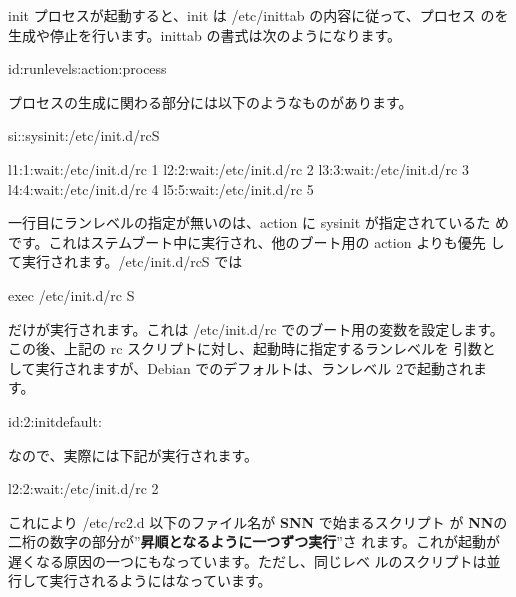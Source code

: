 \documentclass[mingoth,a4paper]{jsarticle}
\begin{document}
init プロセスが起動すると、init は /etc/inittab の内容に従って、プロセス
のを生成や停止を行います。inittab の書式は次のようになります。

\begin{commandline}
id:runlevels:action:process
\end{commandline}

プロセスの生成に関わる部分には以下のようなものがあります。

\begin{commandline}
si::sysinit:/etc/init.d/rcS

l1:1:wait:/etc/init.d/rc 1
l2:2:wait:/etc/init.d/rc 2
l3:3:wait:/etc/init.d/rc 3
l4:4:wait:/etc/init.d/rc 4
l5:5:wait:/etc/init.d/rc 5
\end{commandline}

一行目にランレベルの指定が無いのは、action に sysinit が指定されているた
めです。これはステムブート中に実行され、他のブート用の action よりも優先
して実行されます。/etc/init.d/rcS では

\begin{commandline}
exec /etc/init.d/rc S
\end{commandline}

だけが実行されます。これは /etc/init.d/rc でのブート用の変数を設定します。
この後、上記の rc スクリプトに対し、起動時に指定するランレベルを 引数と
して実行されますが、Debian でのデフォルトは、ランレベル 2で起動されます。

\begin{commandline}
id:2:initdefault:
\end{commandline}

なので、実際には下記が実行されます。

\begin{commandline}
l2:2:wait:/etc/init.d/rc 2
\end{commandline}

これにより /etc/rc2.d 以下のファイル名が \textbf{SNN} で始まるスクリプト
が \textbf{NN}の二桁の数字の部分が''\textbf{昇順となるように一つずつ実行}''さ
れます。これが起動が遅くなる原因の一つにもなっています。ただし、同じレベ
ルのスクリプトは並行して実行されるようにはなっています。
\end{document}
